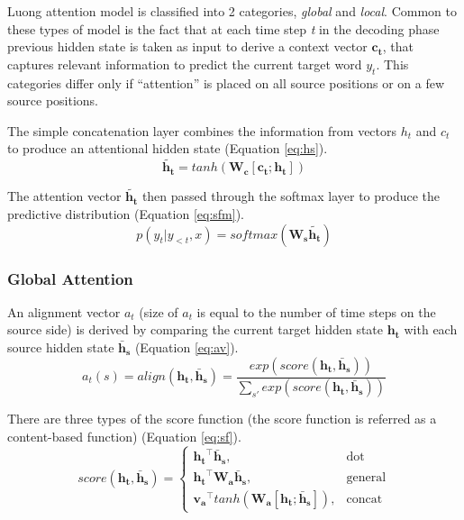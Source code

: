 Luong attention model is classified into 2 categories, \textit{global} and \textit{local}. Common to these types of model is the fact that at each time step \textit{t} in the decoding phase previous hidden state is taken as input to derive a context vector $\mathbf{c_t}$, that captures relevant information to predict the current target word $y_t$. This categories differ only if ``attention'' is placed on all source positions or on a few source positions.

The simple concatenation layer combines the information from vectors $h_t$ and $c_t$ to produce an attentional hidden state (Equation \ref{eq:hs}).
\begin{equation} \label{eq:hs}
\mathbf{\widetilde{h_t}} = tanh(\mathbf{W_c}[\mathbf{c_t};\mathbf{h_t}])
\end{equation}

The attention vector $\mathbf{\widetilde{h_t}}$ then passed through the softmax layer to produce the predictive distribution (Equation \ref{eq:sfm}).
\begin{equation} \label{eq:sfm}
p(y_t|y_{<t},x) = softmax(\mathbf{W_s}\mathbf{\widetilde{h_t}})
\end{equation}

\subsubsection{Global Attention}
An alignment vector $a_t$ (size of $a_t$ is equal to the number of time steps on the source side) is derived by comparing the current target hidden state $\mathbf{h_t}$ with each source hidden state $\mathbf{\bar{h}_s}$ (Equation \ref{eq:av}).
\begin{equation} \label{eq:av}
a_t(s) = align(\mathbf{h_t}, \mathbf{\bar{h}_s}) = \frac{exp(score(\mathbf{h_t}, \mathbf{\bar{h}_s}))}{\sum_{s'} exp(score(\mathbf{h_t}, \mathbf{\bar{h}_s}))}
\end{equation}

There are three types of the score function (the score function is referred as a content-based function) (Equation \ref{eq:sf}).
\begin{equation}\label{eq:sf}
score(\mathbf{h_t}, \mathbf{\bar{h}_s}) = \begin{cases} \mathbf{h_t}^\intercal \mathbf{\bar{h}_s}, & \mbox{dot} \\ \mathbf{h_t}^\intercal \mathbf{W_a} \mathbf{\bar{h}_s}, & \mbox{general} \\ \mathbf{v_a}^\intercal tanh(\mathbf{W_a} [\mathbf{h_t}; \mathbf{\bar{h}_s}]), & \mbox{concat} \end{cases}
\end{equation}


